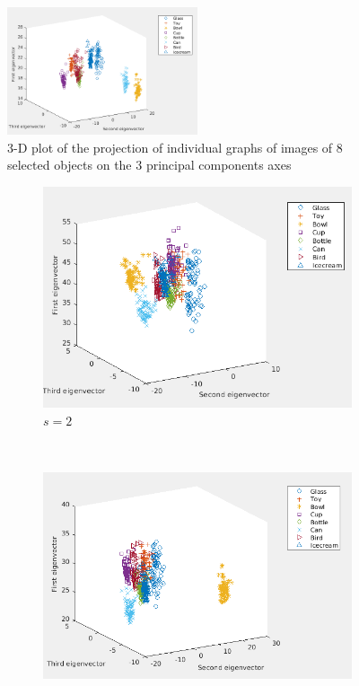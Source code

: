\documentclass[10pt,a4paper]{article}
\begin{document}
\begin{figure}[H]
	\centering
	\includegraphics[width=0.5\textwidth]{images/No-longrange.png}
	\caption{3-D plot of the projection of individual graphs of images of $8$ selected objects on the $3$ principal components axes}
	\label{}
\end{figure}

\begin{figure}[H]
	\centering
	\begin{subfigure}[b]{0.45\textwidth}
		\includegraphics[width= \textwidth]{images/Mellin-s2.png}
		\caption{$s=2$}
		\label{}
	\end{subfigure}~
	\begin{subfigure}[b]{0.45\textwidth}
		\includegraphics[width= \textwidth]{images/Mellin-s3.png}

\end{subfigure}
\end{figure}
\end{document}
